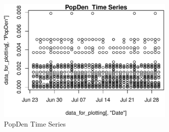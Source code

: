 \begin{figure} 
\centering  
\includegraphics[width=0.77\textwidth]{Code_Outputs/ML_input_report_AllforCaret_cleaned_StepPractice_part_practice_PopDenTS.pdf} 
\caption{\label{fig:ML_input_report_AllforCaret_cleaned_StepPractice_part_practicePopDenTS}PopDen  Time Series} 
\end{figure} 
 
